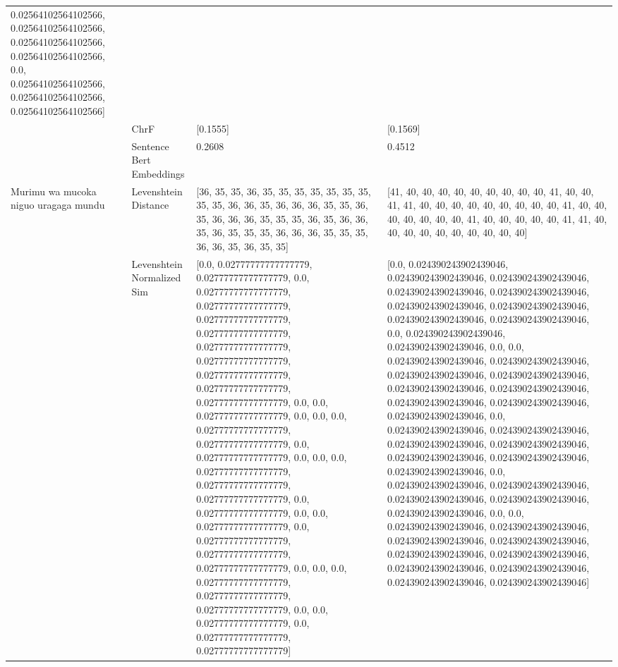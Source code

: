 \begin{tabular}{llll}
0.02564102564102566, 0.02564102564102566, 0.02564102564102566, 0.02564102564102566, 0.0, 0.02564102564102566, 0.02564102564102566, 0.02564102564102566] \\
 & ChrF & [0.1555] & [0.1569] \\
 & Sentence Bert Embeddings & 0.2608 & 0.4512 \\
\cline{1-4}
\multirow[t]{4}{*}{Murimu wa mucoka niguo uragaga mundu} & Levenshtein Distance & [36, 35, 35, 36, 35, 35, 35, 35, 35, 35, 35, 35, 35, 36, 36, 35, 36, 36, 36, 35, 35, 36, 35, 36, 36, 36, 35, 35, 35, 36, 35, 36, 36, 35, 36, 35, 35, 35, 36, 36, 36, 35, 35, 35, 36, 36, 35, 36, 35, 35] & [41, 40, 40, 40, 40, 40, 40, 40, 40, 40, 41, 40, 40, 41, 41, 40, 40, 40, 40, 40, 40, 40, 40, 40, 41, 40, 40, 40, 40, 40, 40, 40, 41, 40, 40, 40, 40, 40, 41, 41, 40, 40, 40, 40, 40, 40, 40, 40, 40, 40] \\
 & Levenshtein Normalized Sim & [0.0, 0.02777777777777779, 0.02777777777777779, 0.0, 0.02777777777777779, 0.02777777777777779, 0.02777777777777779, 0.02777777777777779, 0.02777777777777779, 0.02777777777777779, 0.02777777777777779, 0.02777777777777779, 0.02777777777777779, 0.0, 0.0, 0.02777777777777779, 0.0, 0.0, 0.0, 0.02777777777777779, 0.02777777777777779, 0.0, 0.02777777777777779, 0.0, 0.0, 0.0, 0.02777777777777779, 0.02777777777777779, 0.02777777777777779, 0.0, 0.02777777777777779, 0.0, 0.0, 0.02777777777777779, 0.0, 0.02777777777777779, 0.02777777777777779, 0.02777777777777779, 0.0, 0.0, 0.0, 0.02777777777777779, 0.02777777777777779, 0.02777777777777779, 0.0, 0.0, 0.02777777777777779, 0.0, 0.02777777777777779, 0.02777777777777779] & [0.0, 0.024390243902439046, 0.024390243902439046, 0.024390243902439046, 0.024390243902439046, 0.024390243902439046, 0.024390243902439046, 0.024390243902439046, 0.024390243902439046, 0.024390243902439046, 0.0, 0.024390243902439046, 0.024390243902439046, 0.0, 0.0, 0.024390243902439046, 0.024390243902439046, 0.024390243902439046, 0.024390243902439046, 0.024390243902439046, 0.024390243902439046, 0.024390243902439046, 0.024390243902439046, 0.024390243902439046, 0.0, 0.024390243902439046, 0.024390243902439046, 0.024390243902439046, 0.024390243902439046, 0.024390243902439046, 0.024390243902439046, 0.024390243902439046, 0.0, 0.024390243902439046, 0.024390243902439046, 0.024390243902439046, 0.024390243902439046, 0.024390243902439046, 0.0, 0.0, 0.024390243902439046, 0.024390243902439046, 0.024390243902439046, 0.024390243902439046, 0.024390243902439046, 0.024390243902439046, 0.024390243902439046, 0.024390243902439046, 0.024390243902439046, 0.024390243902439046] \\

\end{tabular}
